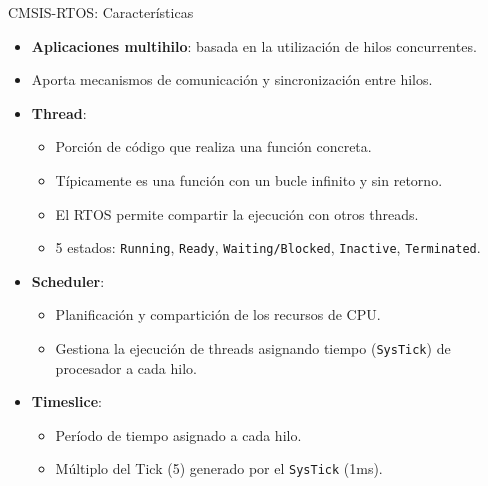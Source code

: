 \begin{frame}{CMSIS-RTOS: Características}
    \begin{itemize}
  \item \textbf{Aplicaciones multihilo}: basada en la utilización de hilos concurrentes.
  \item Aporta mecanismos de comunicación y sincronización entre hilos.
  \item \textbf{Thread}:
    \begin{itemize}
        \item Porción de código que realiza una función concreta.
        \item Típicamente es una función con un bucle infinito y sin retorno.
        \item El RTOS permite compartir la ejecución con otros threads.
        \item 5 estados: \texttt{Running}, \texttt{Ready}, \texttt{Waiting/Blocked}, \texttt{Inactive}, \texttt{Terminated}.
    \end{itemize}
  \item \textbf{Scheduler}:
    \begin{itemize}
        \item Planificación y compartición de los recursos de CPU.
        \item Gestiona la ejecución de threads asignando tiempo (\texttt{SysTick}) de procesador a cada hilo.
    \end{itemize}
  \item \textbf{Timeslice}:
    \begin{itemize}
        \item Período de tiempo asignado a cada hilo.
        \item Múltiplo del Tick (5) generado por el \texttt{SysTick} (1ms).
    \end{itemize}
\end{itemize}

\end{frame}

